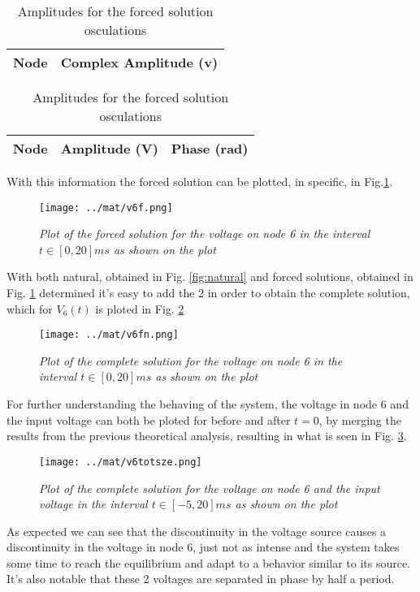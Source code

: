 \begin{table}[H]
    \begin{minipage}{.5\textwidth}
      \centering
      \begin{tabular}{c|c}
        \hline
     Node &  Complex Amplitude (v)\\ 
     \hline
    
    \hline
      \end{tabular}
    \end{minipage}
    \begin{minipage}{.5\textwidth}
      \centering
      \begin{tabular}{c|c|c}
        \hline
          Node &  Amplitude (V) & Phase (rad)\\
          \hline
          
          \hline
      \end{tabular}
    \end{minipage}
    \caption{Amplitudes for the forced solution osculations}
    \label{tab:amplitude}
\end{table}

With this information the forced solution can be plotted, in specific, in Fig.\ref{fig:forced}.

\begin{figure}[H]
    \centering
    \texttt{[image: ../mat/v6f.png]}
        \caption{\textit{Plot of the forced solution for the voltage on node 6 in the interval $t\in[0,20]ms$ as shown on the plot}}
    \label{fig:forced}
\end{figure}

With both natural, obtained in Fig. \ref{fig:natural} and forced solutions, obtained in Fig. \ref{fig:forced} determined it's easy to add the 2 in order to obtain the complete solution, which for $V_6(t)$ is ploted in Fig. \ref{fig:complete}

\begin{figure}[H]
    \centering
    \texttt{[image: ../mat/v6fn.png]}
        \caption{\textit{Plot of the complete solution for the voltage on node 6 in the interval $t\in[0,20]ms$ as shown on the plot}}
    \label{fig:complete}
\end{figure}

For further understanding the behaving of the system, the voltage in node 6 and the input voltage can both be ploted for before and after $t=0$, by merging the results from the previous theoretical analysis, resulting in what is seen in Fig. \ref{fig:tudo}.

\begin{figure}[H]
    \centering
    \texttt{[image: ../mat/v6totsze.png]}
        \caption{\textit{Plot of the complete solution for the voltage on node 6 and the input voltage  in the interval $t\in[-5,20]ms$ as shown on the plot}}
    \label{fig:tudo}
\end{figure}

As expected we can see that the discontinuity in the voltage source causes a discontinuity in the voltage in node 6, just not as intense and the system takes some time to reach the equilibrium and adapt to a behavior similar to its source. It's also notable that these 2 voltages are separated in phase by half a period.
